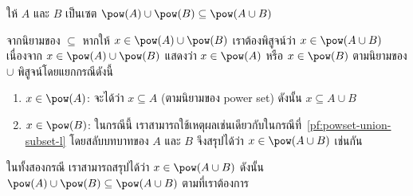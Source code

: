 \begin{theorem}
ให้ $A$ และ $B$ เป็นเซต \enskip $\pow(A)\cup\pow(B)\subseteq\pow(A\cup B)$
\begin{pf}
จากนิยามของ $\subseteq$ หากให้ $x\in\pow(A)\cup\pow(B)$ เราต้องพิสูจน์ว่า $x\in\pow(A\cup B)$ \enskip เนื่องจาก $x\in\pow(A)\cup\pow(B)$ แสดงว่า $x\in\pow(A)$ หรือ $x\in\pow(B)$ ตามนิยามของ $\cup$ \enskip พิสูจน์โดยแยกกรณีดังนี้
\begin{enumerate}[]
\item\label{pf:powset-union-subset-l} $x\in\pow(A)$: จะได้ว่า $x\subseteq A$ (ตามนิยามของ power set) \enskip ดังนั้น $x\subseteq A\cup B$
\item $x\in\pow(B)$: ในกรณีนี้ เราสามารถใช้เหตุผลเช่นเดียวกับในกรณีที่~\ref{pf:powset-union-subset-l} โดยสลับบทบาทของ $A$ และ $B$ \enskip จึงสรุปได้ว่า $x\in\pow(A\cup B)$ เช่นกัน
\end{enumerate}
ในทั้งสองกรณี เราสามารถสรุปได้ว่า $x\in\pow(A\cup B)$ \enskip ดังนั้น $\pow(A)\cup\pow(B)\subseteq\pow(A\cup B)$ ตามที่เราต้องการ
\end{pf}
\end{theorem}

